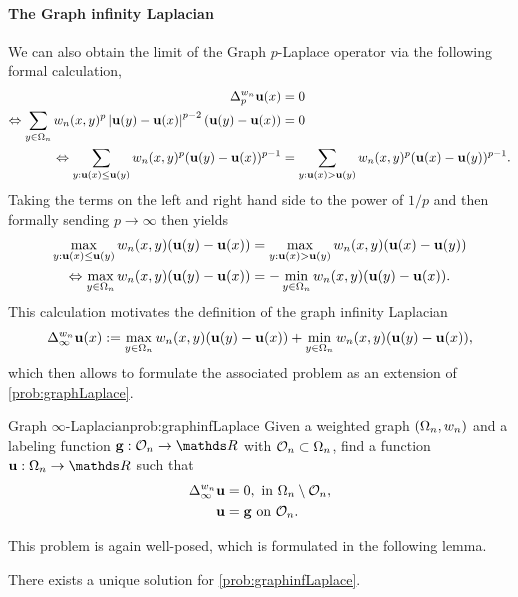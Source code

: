 %
%
%
%
\paragraph{The Graph infinity Laplacian}
%
We can also obtain the limit of the Graph $p$-Laplace operator via the following formal calculation,
%
\begin{align*}
\Delta^{w_n}_p \vec u(x) &= 0\\
\Leftrightarrow \sum_{y\in\domain_n} w_n(x,y)^{p} \abs{\vec u(y) - \vec u(x)}^{p-2} (\vec u(y) - \vec u(x)) &= 0\\
%
\Leftrightarrow 
\sum_{y: \vec u(x)\leq \vec u(y)} w_n(x,y)^{p}(\vec u(y)-\vec u(x))^{p-1}
&= \sum_{y: \vec u(x)> \vec u(y)} w_n(x,y)^{p}(\vec u(x)-\vec u(y))^{p-1}.
\end{align*}
%
Taking the terms on the left and right hand side to the power of $1/p$ and then formally sending $p\to\infty$ then yields
%
\begin{align*}
\max_{y: \vec u(x)\leq \vec u(y)} w_n(x,y)(\vec u(y)-\vec u(x)) &= 
\max_{y: \vec u(x) > \vec u(y)} w_n(x,y)(\vec u(x)-\vec u(y))\\
%
\Leftrightarrow \max_{y\in\domain_n} w_n(x,y)(\vec u(y)-\vec u(x)) &= 
-\min_{y\in\domain_n} w_n(x,y)(\vec u(y)-\vec u(x)).
\end{align*}
%
%
This calculation motivates the definition of the graph infinity Laplacian
%
\begin{align*}
\Delta_\infty^{w_n} \mathbf{u}(x) := \max_{y\in\Omega_n} w_n(x,y)(\mathbf{u}(y)-\mathbf{u}(x)) +
\min_{y\in\Omega_n} w_n(x,y)(\mathbf{u}(y)-\mathbf{u}(x)),
\end{align*}
%
which then allows to formulate the associated problem as an  extension of \cref{prob:graphLaplace}.

\begin{problem}{Graph $\infty$-Laplacian}{prob:graphinfLaplace}
Given a weighted graph $(\Omega_n, w_n)$ and a labeling function $\vec g:\conset_n\to\R$ with $\mathcal{O}_n\subset\Omega_n$, find 
a function $\vec u:\domain_n\to\R$ such that
%
\begin{align*}
\Delta_\infty^{w_n} \mathbf{u} &= 0, \text{ in } \Omega_n\setminus \mathcal{O}_n,\\
\mathbf{u} &= \mathbf{g} \text{ on } \mathcal{O}_n.
\end{align*}
\end{problem}
%
%
This problem is again well-posed, which is formulated in the following lemma.
%
\begin{lemma}{}{}
There exists a unique solution for \cref{prob:graphinfLaplace}.
\end{lemma}
%
%

